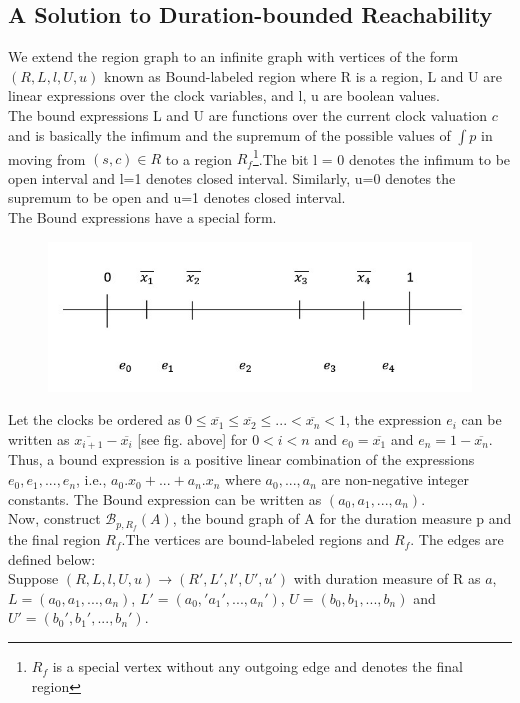 \documentclass[a4paper,UKenglish,cleveref, autoref, thm-restate]{lipics-v2019}
\begin{document}
\subsection{A Solution to Duration-bounded Reachability}
We extend the region graph to an infinite graph with vertices of the form $(R,L,l,U,u)$ known as Bound-labeled region where R is a region, L and U are linear expressions over the clock variables, and l, u are boolean values.\\
The bound expressions L and U are functions over the current clock valuation $c$ and is basically the infimum and the supremum of the possible values of $\int p$ in moving from $(s,c) \in R$ to a region $R_f$\footnote{$R_f$ is  a special vertex without any outgoing edge and denotes the final region}.The bit l = 0 denotes the infimum to be open interval and l=1 denotes closed interval. Similarly, u=0 denotes the supremum to be open and u=1 denotes closed interval.\\
The Bound expressions have a special form.
\begin{figure}[h]
\centering
\includegraphics[scale=.4]{exp}
\end{figure}
Let the clocks be ordered as $0 \leq \overline{x_1} \leq \overline{x_2}\leq ... < \overline{x_n} < 1$, the expression $e_i$ can be written as $\overline{x_{i+1}} - \overline{x_i}$ [see fig. above] for $0<i<n$ and $e_0 = \overline{x_1}$ and $e_n = 1 - \overline{x_n}$.
Thus, a bound expression is a positive linear combination of the expressions $e_0,e_1,...,e_n$, i.e., $a_0.x_0 +...+a_n.x_n$ where $a_0,...,a_n$ are non-negative integer constants. The Bound expression can be written as $(a_0,a_1,...,a_n)$.\\
Now, construct $\mathcal{B}_{p,R_f}(A)$, the bound graph of A for the duration measure p and the final region $R_f$.The vertices are bound-labeled regions and $R_f$. The edges are defined below:\\
Suppose $(R,L,l,U,u) \rightarrow (R',L',l',U',u')$ with duration measure of R as $a$, $L=(a_0,a_1,...,a_n)$, $L'=(a_0,'a_1',...,a_n')$, $U=(b_0,b_1,...,b_n)$ and $U'=(b_0',b_1',...,b_n')$. \\
\end{document}
